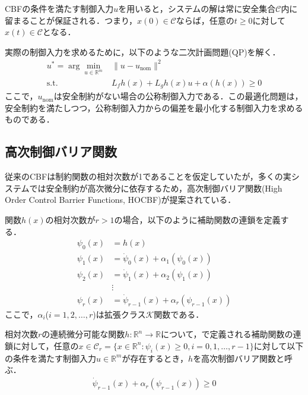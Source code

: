 CBFの条件を満たす制御入力$u$を用いると，システムの解は常に安全集合$\mathcal{C}$内に留まることが保証される．つまり，$x(0) \in \mathcal{C}$ならば，任意の$t \geq 0$に対して$x(t) \in \mathcal{C}$となる．

実際の制御入力を求めるために，以下のような二次計画問題(QP)を解く．
\begin{equation}
\begin{aligned}
u^* = \arg\min_{u \in \mathbb{R}^m} & \|u - u_{\text{nom}}\|^2 \\
\text{s.t.} & L_f h(x) + L_g h(x)u + \alpha(h(x)) \geq 0
\label{eq:cbf_qp}
\end{aligned}
\end{equation}
ここで，$u_{\text{nom}}$は安全制約がない場合の公称制御入力である．この最適化問題は，安全制約を満たしつつ，公称制御入力からの偏差を最小化する制御入力を求めるものである．

\subsection{高次制御バリア関数}

従来のCBFは制約関数の相対次数が1であることを仮定していたが，多くの実システムでは安全制約が高次微分に依存するため，高次制御バリア関数(High Order Control Barrier Functions, HOCBF)が提案されている\cite{Xiao2022}．

関数$h(x)$の相対次数が$r > 1$の場合，以下のように補助関数の連鎖を定義する．
\begin{equation}
\begin{aligned}
\psi_0(x) &= h(x) \\
\psi_1(x) &= \dot{\psi}_0(x) + \alpha_1(\psi_0(x)) \\
\psi_2(x) &= \dot{\psi}_1(x) + \alpha_2(\psi_1(x)) \\
&\vdots \\
\psi_r(x) &= \dot{\psi}_{r-1}(x) + \alpha_r(\psi_{r-1}(x))
\label{eq:hocbf_chain}
\end{aligned}
\end{equation}
ここで，$\alpha_i$($i = 1, 2, \ldots, r$)は拡張クラス$\mathcal{K}$関数である．

\begin{definition}[高次制御バリア関数]
相対次数$r$の連続微分可能な関数$h: \mathbb{R}^n \rightarrow \mathbb{R}$について，で定義される補助関数の連鎖に対して，任意の$x \in \mathcal{C}_r = \{x \in \mathbb{R}^n : \psi_i(x) \geq 0, i = 0, 1, \ldots, r-1\}$に対して以下の条件を満たす制御入力$u \in \mathbb{R}^m$が存在するとき，$h$を高次制御バリア関数と呼ぶ．
\begin{equation}
\begin{aligned}
\dot{\psi}_{r-1}(x) + \alpha_r(\psi_{r-1}(x)) \geq 0
\label{eq:hocbf_condition}
\end{aligned}
\end{equation}
\end{definition}

